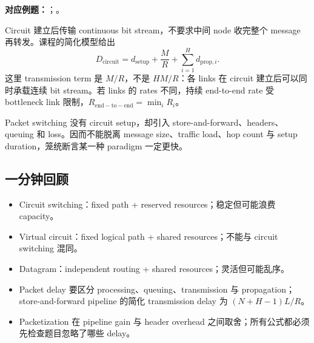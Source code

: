 \textbf{对应例题：}；。


Circuit 建立后传输 continuous bit stream，不要求中间 node 收完整个 message 再转发。课程的简化模型给出
\[
  \boxed{D_{\mathrm{circuit}}
  =d_{\mathrm{setup}}+\frac{M}{R}
  +\sum_{i=1}^{H}d_{\mathrm{prop},i}}.
\]
这里 transmission term 是 $M/R$，不是 $HM/R$：各 links 在 circuit 建立后可以同时承载连续 bit stream。若 links 的 rates 不同，持续 end-to-end rate 受 bottleneck link 限制，$R_{\mathrm{end-to-end}}=\min_i R_i$。

Packet switching 没有 circuit setup，却引入 store-and-forward、headers、queuing 和 loss。因而不能脱离 message size、traffic load、hop count 与 setup duration，笼统断言某一种 paradigm 一定更快。

\subsection{一分钟回顾}

\begin{itemize}
  \item Circuit switching：fixed path + reserved resources；稳定但可能浪费 capacity。
  \item Virtual circuit：fixed logical path + shared resources；不能与 circuit switching 混同。
  \item Datagram：independent routing + shared resources；灵活但可能乱序。
  \item Packet delay 要区分 processing、queuing、transmission 与 propagation；store-and-forward pipeline 的简化 transmission delay 为 $(N+H-1)L/R$。
  \item Packetization 在 pipeline gain 与 header overhead 之间取舍；所有公式都必须先检查题目忽略了哪些 delay。
\end{itemize}
